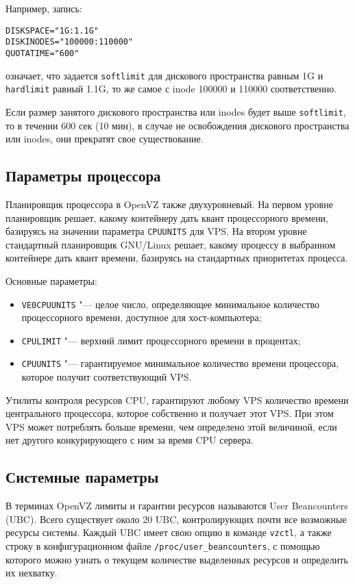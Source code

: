 Например, запись:
\begin{lstlisting}
DISKSPACE="1G:1.1G"
DISKINODES="100000:110000"
QUOTATIME="600" 
\end{lstlisting}
означает, что задается \texttt{softlimit} для дискового пространства равным 1G и \texttt{hardlimit} равный 1.1G, то же самое с inode 100000 и 110000 соответственно.

Если размер занятого дискового пространства или inodes будет выше \texttt{softlimit}, то в течении 600 сек (10 мин), в случае не освобождения дискового пространства или inodes, они прекратят свое существование.

\subsection{Параметры процессора}
Планировщик процессора в OpenVZ также двухуровневый. 
На первом уровне планировщик решает, какому контейнеру дать квант процессорного времени, базируясь на значении параметра \texttt{CPUUNITS} для VPS. 
На втором уровне стандартный планировщик GNU/Linux решает, какому процессу в выбранном контейнере дать квант времени, базируясь на стандартных приоритетах процесса.

Основные параметры:
\begin{itemize}
    \item \texttt{VE0CPUUNITS} "--- целое число, определяющее минимальное количество процессорного времени, доступное для хост-компьютера;
    \item \texttt{CPULIMIT} "--- верхний лимит процессорного времени в процентах;
    \item \texttt{CPUUNITS} "--- гарантируемое минимальное количество времени процессора, которое получит соответствующий VPS.
\end{itemize}

Утилиты контроля ресурсов CPU, гарантируют любому VPS количество времени центрального процессора, которое собственно и получает этот VPS. 
При этом VPS может потреблять больше времени, чем определено этой величиной, если нет другого конкурирующего с ним за время CPU сервера.

\subsection{Системные параметры}

В терминах OpenVZ лимиты и гарантии ресурсов называются User Beancounters (UBC). 
Всего существует около 20 UBC, контролирующих почти все возможные ресурсы системы. 
Каждый UBC имеет свою опцию в команде \texttt{vzctl}, а также строку в конфигурационном файле \texttt{/proc/user\_beancounters}, с помощью которого можно узнать о текущем количестве выделенных ресурсов и определить их нехватку. 

